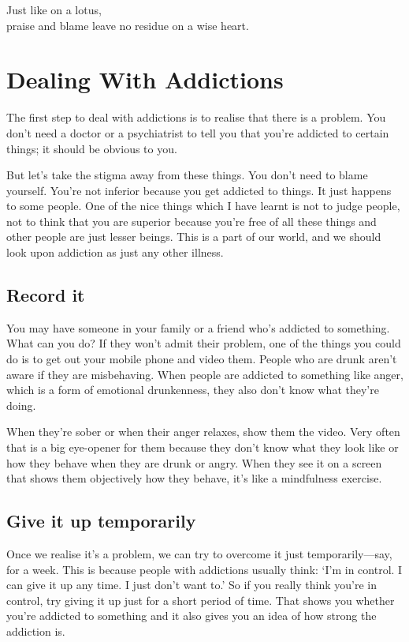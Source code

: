 \documentclass[12pt, openany]{book}
\newenvironment{aphorism}%
{%
\begin{center}\begin{itshape}
}%
{\end{itshape}\end{center}
}%
\newcommand{\fleuron}{%
\begin{center}
\vspace{2em}
\fallbackfont{❦}
\end{center}
}
\begin{document}
\begin{aphorism}
Just like on a lotus,\\  
praise and blame leave no residue on a wise heart.
\end{aphorism}

\fleuron

\chapter{Dealing With Addictions} 

The first step to deal with addictions is to realise that there is a problem. You don’t need a doctor or a psychiatrist to tell you that you’re addicted to certain things; it should be obvious to you. 

But let’s take the stigma away from these things. You don’t need to blame yourself. You’re not inferior because you get addicted to things. It just happens to some people. One of the nice things which I have learnt is not to judge people, not to think that you are superior because you’re free of all these things and other people are just lesser beings. This is a part of our world, and we should look upon addiction as just any other illness. 

\section*{Record it}

You may have someone in your family or a friend who’s addicted to something. What can you do? If they won’t admit their problem, one of the things you could do is to get out your mobile phone and video them. People who are drunk aren’t aware if they are misbehaving. When people are addicted to something like anger, which is a form of emotional drunkenness, they also don’t know what they’re doing. 

When they’re sober or when their anger relaxes, show them the video. Very often that is a big eye-opener for them because they don’t know what they look like or how they behave when they are drunk or angry. When they see it on a screen that shows them objectively how they behave, it’s like a mindfulness exercise. 

\section*{Give it up temporarily}

Once we realise it’s a problem, we can try to overcome it just temporarily—say, for a week. This is because people with addictions usually think: ‘I’m in control. I can give it up any time. I just don’t want to.’ So if you really think you’re in control, try giving it up just for a short period of time. That shows you whether you’re addicted to something and it also gives you an idea of how strong the addiction is. 
\end{document}
